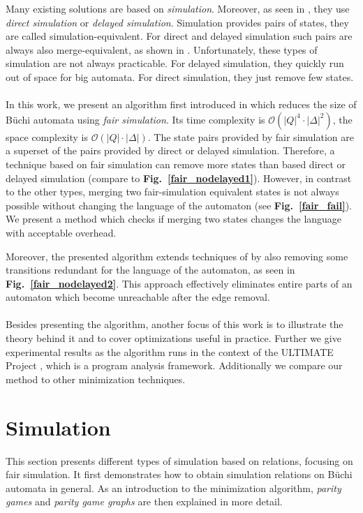\documentclass[12pt,oneside,bibliography=totoc,abstracton]{scrartcl}
\newcommand{\figref}[1]{\textbf{Fig.~\ref{#1}}}
\newcommand{\libref}[1]{\textbf{\cite{#1}}}
\begin{document}
Many existing solutions are based on \textit{simulation}. Moreover, as seen
in \libref{simulation_general}, they use \textit{direct simulation} or \textit{delayed simulation}.
Simulation provides pairs of states, they are called simulation-equivalent.
For direct and delayed simulation such pairs are always also merge-equivalent, as shown in \libref{simulation_general}.
Unfortunately, these types of simulation are not always practicable. For delayed simulation,
they quickly run out of space for big automata. For direct simulation, they just remove few states.\\\\
In this work, we present an algorithm first introduced in \libref{fair_minimization}
which reduces the size of Büchi automata using \textit{fair simulation}.
Its time complexity is $\mathcal{O}(|Q|^4 \cdot |\Delta|^2)$, the space complexity is $\mathcal{O}(|Q| \cdot |\Delta|)$.
The state pairs provided by fair simulation are a superset of the pairs provided by direct or delayed simulation.
Therefore, a technique based on fair simulation can remove more states than based direct or delayed simulation
(compare to \figref{fair_nodelayed1}). However, in contrast to the other types, merging two fair-simulation
equivalent states is not always possible without changing the language of the automaton (see \figref{fair_fail}).
We present a method which checks if merging two states changes the language with acceptable overhead.

Moreover, the presented algorithm extends techniques of \libref{simulation_general} by also removing some
transitions redundant for the language of the automaton, as seen in \figref{fair_nodelayed2}.
This approach effectively eliminates entire parts of an automaton which
become unreachable after the edge removal.\\\\
Besides presenting the algorithm, another focus of this work is to illustrate the theory behind it
and to cover optimizations useful in practice. Further we give experimental results as the
algorithm runs in the context of the ULTIMATE Project \libref{ultimate}, which is a program analysis framework.
Additionally we compare our method to other minimization techniques.

\section{Simulation}
This section presents different types of simulation based on relations, focusing on fair simulation.
It first demonstrates how to obtain simulation relations on Büchi automata in general.
As an introduction to the minimization algorithm, \textit{parity games} and \textit{parity game graphs}
are then explained in more detail.
\end{document}
